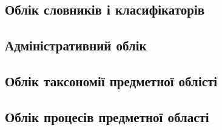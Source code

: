 \subsection{Облік словників і класифікаторів}

\subsection{Адміністративний облік}

\subsection{Облік таксономії предметної облісті}

\subsection{Облік процесів предметної області}

